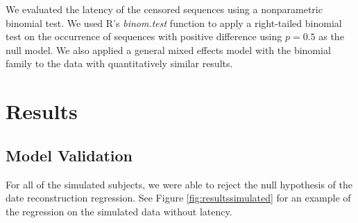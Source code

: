 \documentclass[12pt]{article}
\begin{document}
We evaluated the latency of the censored sequences using a nonparametric binomial test.
We used R's {\it binom.test} function to apply a right-tailed binomial test on the occurrence of sequences with positive difference using $p=0.5$ as the null model.
We also applied a general mixed effects model with the binomial family to the data with quantitatively similar results.




\section * {Results} \label{sec:results}


\subsection * {Model Validation} \label{sec:sim_results}
For all of the simulated subjects, we were able to reject the null hypothesis of the date reconstruction regression. See Figure \ref{fig:resultssimulated} for an example of the regression on the simulated data without latency.
\end{document}

